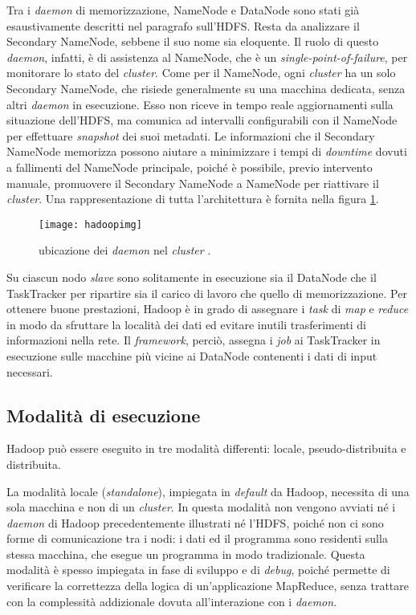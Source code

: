 Tra i \textit{daemon} di memorizzazione, NameNode e DataNode sono stati già esaustivamente descritti nel paragrafo sull’HDFS. Resta da analizzare il Secondary NameNode, sebbene il 
suo nome sia eloquente. Il ruolo di questo \textit{daemon}, infatti, è di assistenza al NameNode, che è un \textit{single-point-of-failure}, per monitorare lo stato del \textit{cluster}. Come per il 
NameNode, ogni \textit{cluster} ha un solo Secondary NameNode, che risiede generalmente su una macchina dedicata, senza altri \textit{daemon} in esecuzione. Esso non riceve in tempo reale 
aggiornamenti sulla situazione dell’HDFS, ma comunica ad intervalli configurabili con il NameNode per effettuare \textit{snapshot} dei suoi metadati. Le informazioni che il Secondary
NameNode memorizza possono aiutare a minimizzare i tempi di \textit{downtime} dovuti a fallimenti del NameNode principale, poiché è possibile, previo intervento manuale, promuovere il
Secondary NameNode a NameNode per riattivare il \textit{cluster}. Una rappresentazione di tutta l'architettura è fornita nella figura \ref{architecture}.

\begin{figure}[ht]
\centering
\texttt{[image: hadoopimg]}
\caption{ubicazione dei \textit{daemon} nel \textit{cluster} \cite{hadoop}.}
\label{architecture}
\end{figure}

Su ciascun nodo \textit{slave} sono solitamente in esecuzione sia il DataNode che il TaskTracker per ripartire sia il carico di lavoro che quello di memorizzazione. Per ottenere buone
prestazioni, Hadoop è in grado di assegnare i \textit{task} di \textit{map} e \textit{reduce} in modo da sfruttare la località dei dati ed evitare inutili trasferimenti di informazioni nella rete. Il 
\textit{framework}, perciò, assegna i \textit{job} ai TaskTracker in esecuzione sulle macchine più vicine ai DataNode contenenti i dati di input necessari.


\subsection{Modalità di esecuzione}

Hadoop può essere eseguito in tre modalità differenti: locale, pseudo-distribuita e distribuita.

La modalità locale (\textit{standalone}), impiegata in \textit{default} da Hadoop, necessita di una sola macchina e non di un \textit{cluster}. In questa modalità non vengono avviati né i \textit{daemon} di Hadoop 
precedentemente illustrati né l’HDFS, poiché non ci sono forme di comunicazione tra i nodi: i dati ed il programma sono residenti sulla stessa macchina, che esegue un 
programma in modo tradizionale. Questa modalità è spesso impiegata in fase di sviluppo e di \textit{debug}, poiché permette di verificare la correttezza della logica di un’applicazione 
MapReduce, senza trattare con la complessità addizionale dovuta all’interazione con i \textit{daemon}.

